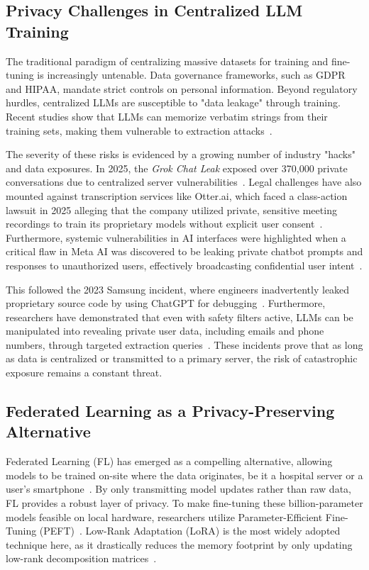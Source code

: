 \documentclass[conference]{IEEEtran}
\begin{document}
\subsection{Privacy Challenges in Centralized LLM Training}
The traditional paradigm of centralizing massive datasets for training and fine-tuning is increasingly untenable. Data governance frameworks, such as GDPR~\cite{voigt2017gdpr} and HIPAA, mandate strict controls on personal information. Beyond regulatory hurdles, centralized LLMs are susceptible to "data leakage" through training. Recent studies show that LLMs can memorize verbatim strings from their training sets, making them vulnerable to extraction attacks~\cite{carlini2021extracting, shokri2017membership}.

The severity of these risks is evidenced by a growing number of industry "hacks" and data exposures. In 2025, the \textit{Grok Chat Leak} exposed over 370,000 private conversations due to centralized server vulnerabilities~\cite{burgess2025grok}. Legal challenges have also mounted against transcription services like Otter.ai, which faced a class-action lawsuit in 2025 alleging that the company utilized private, sensitive meeting recordings to train its proprietary models without explicit user consent~\cite{npr2025otter}. Furthermore, systemic vulnerabilities in AI interfaces were highlighted when a critical flaw in Meta AI was discovered to be leaking private chatbot prompts and responses to unauthorized users, effectively broadcasting confidential user intent~\cite{tomsguide2025meta}.

This followed the 2023 Samsung incident, where engineers inadvertently leaked proprietary source code by using ChatGPT for debugging~\cite{samsung2023leak}. Furthermore, researchers have demonstrated that even with safety filters active, LLMs can be manipulated into revealing private user data, including emails and phone numbers, through targeted extraction queries~\cite{nasr2023extraction}. These incidents prove that as long as data is centralized or transmitted to a primary server, the risk of catastrophic exposure remains a constant threat.

\subsection{Federated Learning as a Privacy-Preserving Alternative}
Federated Learning (FL) has emerged as a compelling alternative, allowing models to be trained on-site where the data originates, be it a hospital server or a user's smartphone~\cite{mcmahan2017fedavg, kairouz2021advances}. By only transmitting model updates rather than raw data, FL provides a robust layer of privacy. To make fine-tuning these billion-parameter models feasible on local hardware, researchers utilize Parameter-Efficient Fine-Tuning (PEFT)~\cite{houlsby2019peft}. Low-Rank Adaptation (LoRA) is the most widely adopted technique here, as it drastically reduces the memory footprint by only updating low-rank decomposition matrices~\cite{hu2021lora}.
\end{document}
